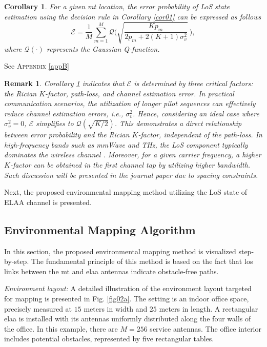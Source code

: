 \documentclass[conference, a4paper]{IEEEtran}
\newtheorem{cor}{Corollary}
\newtheorem{rmk}{Remark}
\newcommand{\appref}[1]{\textsc{Appendix} \ref{#1}}
\newcommand{\corref}[1]{{\it Corollary \ref{#1}}}
\newcommand{\figref}[1]{Fig. \ref{#1}}
\begin{document}
\begin{cor} \label{cor02}
For a given \gls{mt} location, the error probability of LoS state estimation using the decision rule in \corref{cor01} can be expressed as follows
	\begin{equation} \label{eqn06040925}
		\mathscr{E} = \dfrac{1}{M} \sum_{m = 1}^{M} \mathcal{Q} \Bigg(\sqrt{\frac{Kp_{m}}{2p_{m} + 2(K + 1)\sigma_{v}^{2}}}\ \Bigg),
	\end{equation}
	where $\mathcal{Q}(\cdot)$ represents the Gaussian Q-function.
\end{cor}

\begin{IEEEproof}
	See \appref{appB}
\end{IEEEproof}

\begin{rmk} \label{rmk04}
	\corref{cor02} indicates that $\mathscr{E}$ is determined by three critical factors: the Rician $K$-factor, path-loss, and channel estimation error.
	In practical communication scenarios, the utilization of longer pilot sequences can effectively reduce channel estimation errors, i.e., $\sigma_{v}^{2}$.
	Hence, considering an ideal case where $\sigma_{v}^{2} = 0$, $\mathscr{E}$ simplifies to $\mathcal{Q}(\sqrt{K/2})$. 
	This demonstrates a direct relationship between error probability and the Rician $K$-factor, independent of the path-loss.
	In high-frequency bands such as mmWave and THz, the LoS component typically dominates the wireless channel \cite{Ge2023a}.
	Moreover, for a given carrier frequency, a higher $K$-factor can be obtained in the first channel tap by utilizing higher bandwidth.
	Such discussion will be presented in the journal paper due to spacing constraints.
\end{rmk}

Next, the proposed environmental mapping method utilizing the LoS state of ELAA channel is presented.

\subsection{Environmental Mapping Algorithm}
In this section, the proposed environmental mapping method is visualized step-by-step.
The fundamental principle of this method is based on the fact that \gls{los} links between the \gls{mt} and \gls{elaa} antennas indicate obstacle-free paths.

{\it Environment layout:}
A detailed illustration of the environment layout targeted for mapping is presented in \figref{fig02a}.
The setting is an indoor office space, precisely measured at $15$ meters in width and $25$ meters in length.
A rectangular \gls{elaa} is installed with its antennas uniformly distributed along the four walls of the office.
In this example, there are $M = 256$ service antennas.
The office interior includes potential obstacles, represented by five rectangular tables.
\end{document}
